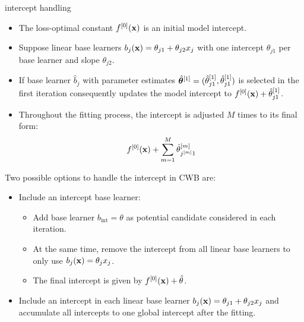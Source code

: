 \documentclass[11pt,compress,t,notes=noshow, xcolor=table]{beamer}
\begin{document}
\begin{vbframe}{intercept handling}

\begin{itemize}
  \item The loss-optimal constant $f^{[0]}(\mathbf{x})$ is an initial model intercept.
  \item Suppose linear base learners $b_j(\mathbf{x}) = \theta_{j1} + \theta_{j2} x_j$ with one intercept $\theta_{j1}$ per base learner and slope $\theta_{j2}$.
  \item If base learner $\hat{b}_j$ with parameter estimates $\hat{\bm{\theta}}^{[1]} = (\hat{\theta}_{j1}^{[1]}, \hat{\theta}_{j1}^{[1]})$ is selected in the first iteration consequently updates the model intercept to $f^{[0]}(\mathbf{x}) + \hat{\theta}_{j1}^{[1]}$.
  \item Throughout the fitting process, the intercept is adjusted $M$ times to its final form:
    $$
    f^{[0]}(\mathbf{x}) + \sum\limits_{m=1}^M \hat{\theta}^{[m]}_{j^{[m]}1}
    $$
\end{itemize}

\framebreak

Two possible options to handle the intercept in CWB are:

\begin{itemize}

\item Include an intercept base learner:
  \begin{itemize}
    \item Add base learner $b_{\text{int}} = \theta$ as potential candidate considered in each iteration.
    \item At the same time, remove the intercept from all linear base learners to only use $b_j(\mathbf{x}) = \theta_j x_j$.
    \item The final intercept is given by $f^{[0]}(\mathbf{x}) + \hat{\theta}$.
  \end{itemize}
  \item Include an intercept in each linear base learner $b_j(\mathbf{x}) = \theta_{j1} + \theta_{j2} x_j$ and accumulate all intercepts to one global intercept after the fitting.

\end{itemize}



\end{vbframe}
\end{document}
